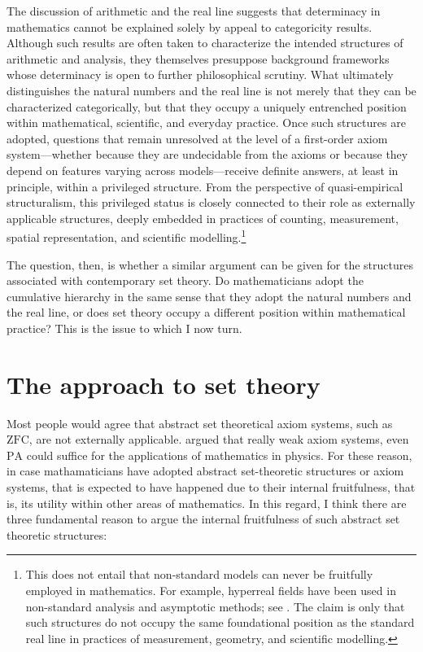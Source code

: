 \documentclass[11pt,a4paper]{book}
\theoremstyle{plain}
\begin{document}
The discussion of arithmetic and the real line suggests that determinacy in mathematics cannot be explained solely by appeal to categoricity results. Although such results are often taken to characterize the intended structures of arithmetic and analysis, they themselves presuppose background frameworks whose determinacy is open to further philosophical scrutiny. What ultimately distinguishes the natural numbers and the real line is not merely that they can be characterized categorically, but that they occupy a uniquely entrenched position within mathematical, scientific, and everyday practice. Once such structures are adopted, questions that remain unresolved at the level of a first-order axiom system—whether because they are undecidable from the axioms or because they depend on features varying across models—receive definite answers, at least in principle, within a privileged structure. From the perspective of quasi-empirical structuralism, this privileged status is closely connected to their role as externally applicable structures, deeply embedded in practices of counting, measurement, spatial representation, and scientific modelling.\footnote{This does not entail that non-standard models can never be fruitfully employed in mathematics. For example, hyperreal fields have been used in non-standard analysis and asymptotic methods; see \textcite{lightstone1975nonarchimedean}. The claim is only that such structures do not occupy the same foundational position as the standard real line in practices of measurement, geometry, and scientific modelling.}

The question, then, is whether a similar argument can be given for the structures associated with contemporary set theory. Do mathematicians adopt the cumulative hierarchy in the same sense that they adopt the natural numbers and the real line, or does set theory occupy a different position within mathematical practice? This is the issue to which I now turn.

\section{The approach to set theory}
\label{set-theory}


Most people would agree that abstract set theoretical axiom systems, such as $\mathrm{ZFC}$, are not externally applicable. \textcite{Feferman1993} argued that really weak axiom systems, even $\mathrm{PA}$ could suffice for the applications of mathematics in physics. For these reason, in case mathamaticians have adopted abstract set-theoretic structures or axiom systems, that is expected to have happened due to their internal fruitfulness, that is, its utility within other areas of mathematics. In this regard, I think there are three fundamental reason to argue the internal fruitfulness of such abstract set theoretic structures:
 
\end{document}
